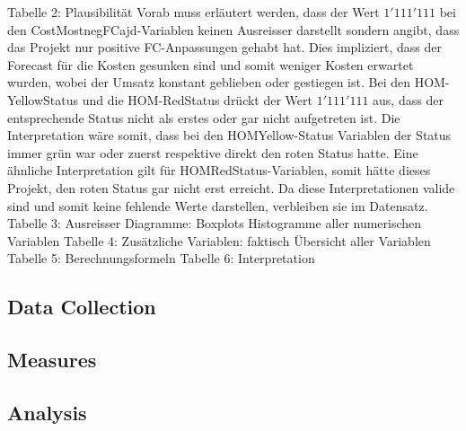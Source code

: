 Tabelle 2: Plausibilität
Vorab muss erläutert werden, dass der Wert $1'111'111$ bei den CostMostnegFCajd-Variablen keinen Ausreisser darstellt sondern angibt, dass das Projekt nur positive FC-Anpassungen gehabt hat. Dies impliziert, dass der Forecast für die Kosten gesunken sind und somit weniger Kosten erwartet wurden, wobei der Umsatz konstant geblieben oder gestiegen ist. Bei den HOM-YellowStatus und die HOM-RedStatus drückt der Wert $1'111'111$ aus, dass der entsprechende Status nicht als erstes oder gar nicht aufgetreten ist. Die Interpretation wäre somit, dass bei den HOMYellow-Status Variablen der Status immer grün war oder zuerst respektive direkt den roten Status hatte. Eine ähnliche Interpretation gilt für HOMRedStatus-Variablen, somit hätte dieses Projekt, den roten Status gar nicht erst erreicht. Da diese Interpretationen valide sind und somit keine fehlende Werte darstellen, verbleiben sie im Datensatz. 
Tabelle 3: Ausreisser
Diagramme: Boxplots Histogramme aller numerischen Variablen
Tabelle 4: Zusätzliche Variablen: faktisch Übersicht aller Variablen 
Tabelle 5: Berechnungsformeln
Tabelle 6: Interpretation

\subsection*{Data Collection}
\subsection*{Measures}
\subsection*{Analysis}